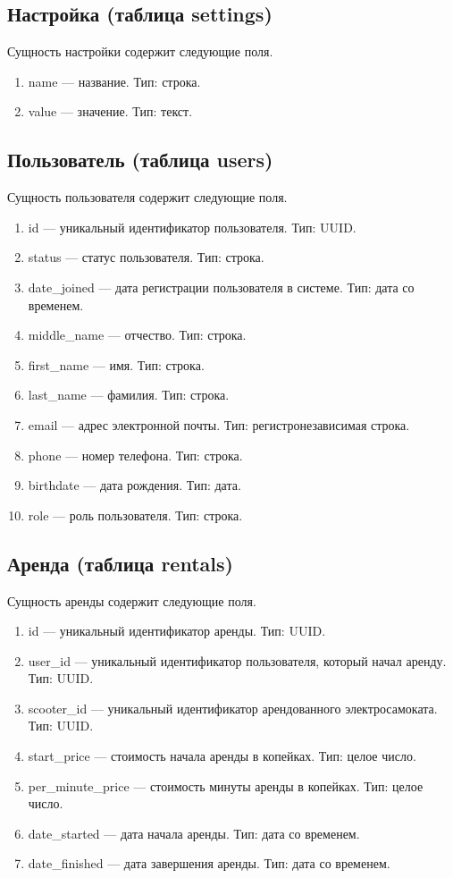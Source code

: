 \subsection{Настройка (таблица settings)}

Сущность настройки содержит следующие поля.

\begin{enumerate}
	\item name --- название. Тип: строка.
	\item value --- значение. Тип: текст.
\end{enumerate}

\subsection{Пользователь (таблица users)}

Сущность пользователя содержит следующие поля.

\begin{enumerate}
	\item id --- уникальный идентификатор пользователя. Тип: UUID.
	\item status --- статус пользователя. Тип: строка.
	\item date\_joined --- дата регистрации пользователя в системе. Тип: дата со
	      временем.
	\item middle\_name --- отчество. Тип: строка.
	\item first\_name --- имя. Тип: строка.
	\item last\_name --- фамилия. Тип: строка.
	\item email --- адрес электронной почты. Тип: регистронезависимая строка.
	\item phone --- номер телефона. Тип: строка.
	\item birthdate --- дата рождения. Тип: дата.
	\item role --- роль пользователя. Тип: строка.
\end{enumerate}

\subsection{Аренда (таблица rentals)}

Сущность аренды содержит следующие поля.

\begin{enumerate}
	\item id --- уникальный идентификатор аренды. Тип: UUID.
	\item user\_id --- уникальный идентификатор пользователя, который начал аренду. Тип:
	      UUID.
	\item scooter\_id --- уникальный идентификатор арендованного электросамоката. Тип:
	      UUID.
	\item start\_price --- стоимость начала аренды в копейках. Тип: целое число.
	\item per\_minute\_price --- стоимость минуты аренды в копейках. Тип: целое число.
	\item date\_started --- дата начала аренды. Тип: дата со временем.
	\item date\_finished --- дата завершения аренды. Тип: дата со временем.
\end{enumerate}

